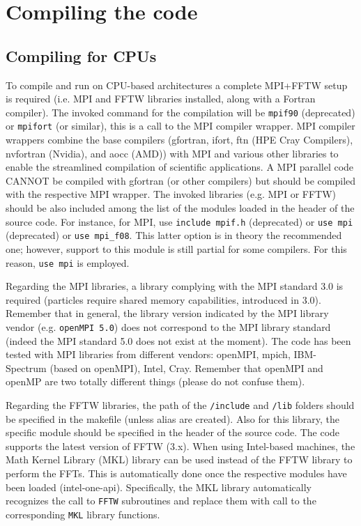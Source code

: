\section{Compiling the code}

\subsection{Compiling for CPUs}
To compile and run on CPU-based architectures a complete MPI+FFTW setup is required (i.e. MPI and FFTW libraries installed, along with a Fortran compiler).
The invoked command for the compilation will be \texttt{mpif90} (deprecated) or \texttt{mpifort} (or similar), this is a call to the MPI compiler wrapper.
MPI compiler wrappers combine the base compilers (gfortran, ifort, ftn (HPE Cray Compilers), nvfortran (Nvidia), and aocc (AMD)) with MPI and various other libraries to enable the streamlined compilation of scientific applications.
A MPI parallel code CANNOT be compiled with gfortran (or other compilers) but should be compiled with the respective MPI wrapper.
The invoked libraries (e.g. MPI or FFTW) should be also included among the list of the modules loaded in the header of the source code. 
For instance, for MPI, use \texttt{include mpif.h} (deprecated) or \texttt{use mpi} (deprecated) or \texttt{use mpi\_f08}.
This latter option is in theory the recommended one; however, support to this module is still partial for some compilers.
For this reason,  \texttt{use mpi} is employed.


Regarding the MPI libraries, a library complying with the MPI standard 3.0 is required (particles require shared memory capabilities, introduced in 3.0). 
Remember that in general, the library version indicated by the MPI library vendor (e.g. \texttt{openMPI 5.0}) does not correspond to the MPI library standard (indeed the MPI standard 5.0 does not exist at the moment).
The code has been tested with MPI libraries from different vendors: openMPI, mpich, IBM-Spectrum (based on openMPI), Intel, Cray.
Remember that openMPI and openMP are two totally different things (please do not confuse them).

Regarding the FFTW libraries, the path of the \texttt{/include} and \texttt{/lib} folders should be specified in the makefile (unless alias are created).
Also for this library, the specific module should be specified in the header of the source code.
The code supports the latest version of FFTW (3.x).
When using Intel-based machines, the Math Kernel Library (MKL) library can be used instead of the FFTW library to perform the FFTs.
This is automatically done once the respective modules have been loaded (intel-one-api).
Specifically, the MKL library automatically recognizes the call to \texttt{FFTW} subroutines and replace them with call to the corresponding \texttt{MKL} library functions.



